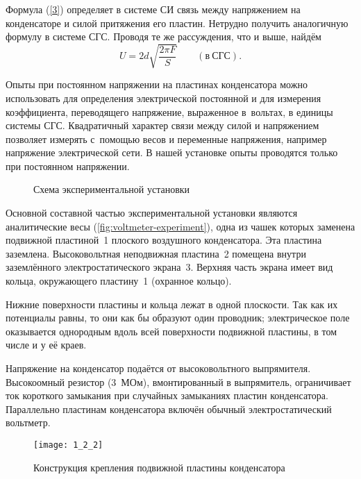 Формула (\eqref{3}) определяет в системе СИ связь между напряжением на конденсаторе и силой притяжения его пластин. Нетрудно
получить аналогичную формулу в системе СГС. Проводя те же рассуждения, что и выше, найдём
\begin{equation}
	U=2d\sqrt{\frac{2\pi F}{S}}\qquad(в~СГС).
\end{equation}

Опыты при постоянном напряжении на пластинах конденсатора можно использовать для определения электрической постоянной и
для измерения коэффициента, переводящего напряжение, выраженное в~вольтах, в единицы системы СГС. Квадратичный характер
связи между силой и напряжением позволяет измерять с~помощью весов и переменные напряжения, например напряжение
электрической сети. В нашей установке опыты проводятся только при постоянном напряжении.

\begin{figure}
	\caption{Схема экспериментальной установки}
\end{figure}

\experiment Основной составной частью экспериментальной установки являются аналитические весы (\ref{fig:voltmeter-experiment}), одна из чашек которых
заменена подвижной пластиной~1 плоского воздушного конденсатора. Эта пластина заземлена. Высоковольтная неподвижная
пластина~2 помещена внутри заземлённого электростатического экрана~3. Верхняя часть экрана имеет вид кольца, окружающего
пластину~1 (охранное кольцо).

Нижние поверхности пластины и кольца лежат в одной плоскости. Так как их потенциалы равны, то они как бы образуют один
проводник; электрическое поле оказывается однородным вдоль всей поверхности подвижной пластины, в том числе и у её краев.

Напряжение на конденсатор подаётся от высоковольтного выпрямителя. Высокоомный резистор (3~МОм), вмонтированный в
выпрямитель, ограничивает ток короткого замыкания при случайных замыканиях пластин конденсатора. Параллельно пластинам
конденсатора включён обычный электростатический вольтметр.

\begin{wrapfigure}{r}{0.4\textwidth}
	\texttt{[image: 1\_2\_2]}
	\caption{Конструкция крепления подвижной пластины конденсатора}
\end{wrapfigure}

